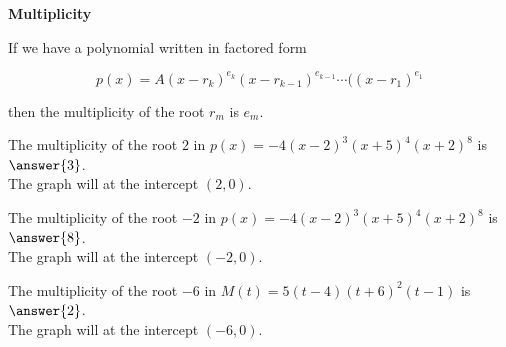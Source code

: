 \documentclass{ximera}
\author{Lee Wayand}
\begin{document}
\begin{exercise}






\begin{idea} \textbf{\textcolor{blue!55!black}{Multiplicity}}


If we have a polynomial written in factored form

\[
p(x) = A (x-r_k)^{e_k} (x-r_{k-1})^{e_{k-1}}  \cdots ((x-r_1)^{e_1}
\]

then the multiplicity of the root $r_m$ is $e_m$. \\





\end{idea}



\begin{question}


The multiplicity of the root $2$ in $p(x) = -4 (x - 2)^3 (x + 5)^4 (x + 2)^8$ is $\answer{3}$. \\



The graph will  at the intercept $(2, 0)$.

\end{question}





\begin{question}


The multiplicity of the root $-2$ in $p(x) = -4 (x - 2)^3 (x + 5)^4 (x + 2)^8$ is $\answer{8}$. \\



The graph will  at the intercept $(-2, 0)$.

\end{question}





\begin{question}


The multiplicity of the root $-6$ in $M(t) = 5(t - 4) (t + 6)^2 (t - 1)$ is $\answer{2}$. \\



The graph will  at the intercept $(-6, 0)$.




\end{question}
\end{exercise}
\end{document}
